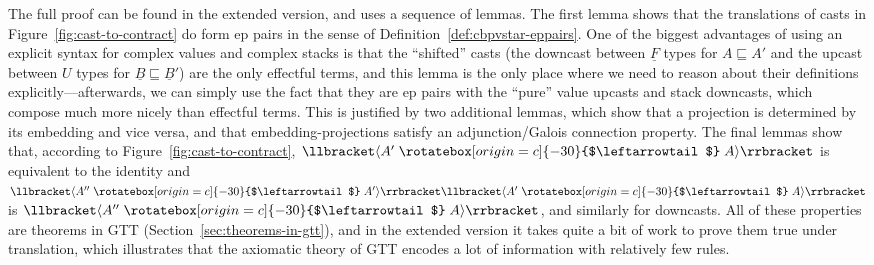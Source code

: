 \documentclass[acmsmall,screen,12pt]{acmart}
\renewcommand{\u}{\underline}
\newcommand{\sem}[1]{\llbracket#1\rrbracket}
\newcommand{\supcast}[2]{\sem{\upcast{#1}{#2}}}
\newcommand{\ltdyn}{\sqsubseteq}
\newcommand{\uarrow}{\mathrel{\rotatebox[origin=c]{-30}{$\leftarrowtail$}}}
\newcommand{\upcast}[2]{\langle{#2}\uarrow{#1}\rangle}
\begin{document}
\begin{shortonly}
  The full proof can be found in the extended version, and uses a
  sequence of lemmas.  The first lemma shows that the translations of
  casts in Figure~\ref{fig:cast-to-contract} do form ep pairs in the
  sense of Definition~\ref{def:cbpvstar-eppairs}.  One of the biggest
  advantages of using an explicit syntax for complex values and complex
  stacks is that the ``shifted'' casts (the downcast between $\u F$
  types for $A \ltdyn A'$ and the upcast between $U$ types for $\u B
  \ltdyn \u B'$) are the only effectful terms, and this lemma is the
  only place where we need to reason about their definitions
  explicitly---afterwards, we can simply use the fact that they are ep
  pairs with the ``pure'' value upcasts and stack downcasts, which
  compose much more nicely than effectful terms.  This is justified by two
  additional lemmas, which show that a projection is determined
  by its embedding and vice versa, and that embedding-projections
  satisfy an adjunction/Galois connection property.  The final lemmas
  show that, according to Figure~\ref{fig:cast-to-contract},
  $\supcast{A}{A'}$ is equivalent to the identity and
  $\supcast{A'}{A''}\supcast{A}{A'}$ is $\supcast{A}{A''}$, and
  similarly for downcasts.  All of these properties are theorems in GTT
  (Section~\ref{sec:theorems-in-gtt}), and in the extended version it
  takes quite a bit of work to prove them true under translation, which
  illustrates that the axiomatic theory of GTT encodes a lot of
  information with relatively few rules.
\end{shortonly}
\end{document}
